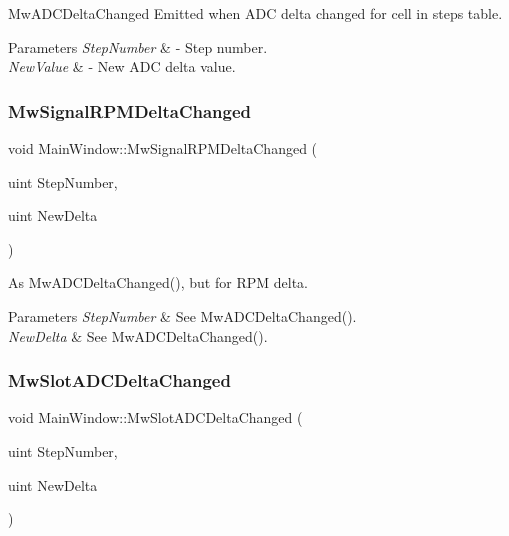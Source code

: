 Mw\+A\+D\+C\+Delta\+Changed Emitted when A\+DC delta changed for cell in steps table. 


\begin{DoxyParams}{Parameters}
{\em Step\+Number} & -\/ Step number. \\
\hline
{\em New\+Value} & -\/ New A\+DC delta value. \\
\hline
\end{DoxyParams}
\mbox{\label{class_main_window_a7b5fab96f0c2363958436141a3aae65b}} 
\subsubsection{\texorpdfstring{Mw\+Signal\+R\+P\+M\+Delta\+Changed}{MwSignalRPMDeltaChanged}}
{\footnotesize\ttfamily void Main\+Window\+::\+Mw\+Signal\+R\+P\+M\+Delta\+Changed (\begin{DoxyParamCaption}\item[{uint}]{Step\+Number,  }\item[{uint}]{New\+Delta }\end{DoxyParamCaption})\hspace{0.3cm}{\ttfamily [signal]}}



As Mw\+A\+D\+C\+Delta\+Changed(), but for R\+PM delta. 


\begin{DoxyParams}{Parameters}
{\em Step\+Number} & See Mw\+A\+D\+C\+Delta\+Changed(). \\
\hline
{\em New\+Delta} & See Mw\+A\+D\+C\+Delta\+Changed(). \\
\hline
\end{DoxyParams}
\mbox{\label{class_main_window_a5778840f76f8ce6edd63d84b57b801b1}} 
\subsubsection{\texorpdfstring{Mw\+Slot\+A\+D\+C\+Delta\+Changed}{MwSlotADCDeltaChanged}}
{\footnotesize\ttfamily void Main\+Window\+::\+Mw\+Slot\+A\+D\+C\+Delta\+Changed (\begin{DoxyParamCaption}\item[{uint}]{Step\+Number,  }\item[{uint}]{New\+Delta }\end{DoxyParamCaption})\hspace{0.3cm}{\ttfamily [slot]}}



